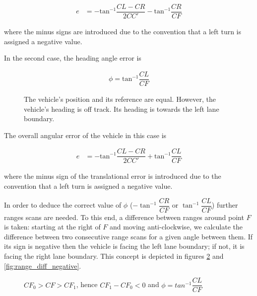 \documentclass[oneside,12pt]{article}
\begin{document}
    \begin{align}
      e &= -\text{tan}^{-1}\dfrac{CL-CR}{2CC'} - \text{tan}^{-1}\dfrac{CR}{CF}
    \end{align}

    where the minus signs are introduced due to the
    convention that a left turn is assigned a negative value.


    In the second case, the heading angle error is

    \begin{align}
      \phi = \text{tan}^{-1}\dfrac{CL}{CF}
    \end{align}

    \begin{figure}[H]\centering
      \scalebox{1}{}
      \caption{The vehicle's position and its reference are equal. However,
        the vehicle's heading is off track. Its heading is towards the left
        lane boundary.}
      \label{}
    \end{figure}

    The overall angular error of the vehicle in this case is

    \begin{align}
      e &= -\text{tan}^{-1}\dfrac{CL-CR}{2CC'} + \text{tan}^{-1}\dfrac{CL}{CF}
    \end{align}

    where the minus sign of the translational error is introduced due to the
    convention that a left turn is assigned a negative value.


    In order to deduce the correct value of $\phi$ ($-\tan^{-1}\dfrac{CR}{CF}$ or
    $\tan^{-1}\dfrac{CL}{CF}$) further ranges scans are needed. To this end,
    a difference between ranges around point $F$ is taken: starting at the
    right of $F$ and moving anti-clockwise, we calculate the difference between
    two consecutive range scans for a given angle between them. If its sign
    is negative then the vehicle is facing the left lane boundary; if not,
    it is facing the right lane boundary. This concept is depicted in figures
    \ref{fig:range_diff_positive} and  \ref{fig:range_diff_negative}.

    \begin{figure}[H]\centering
      \scalebox{1}{}
      \caption{$CF_0 > CF > CF_1$, hence $CF_1 - CF_0 < 0$ and $\phi = tan^{-1} \dfrac{CL}{CF}$}
      \label{fig:range_diff_positive}
    \end{figure}
\end{document}
